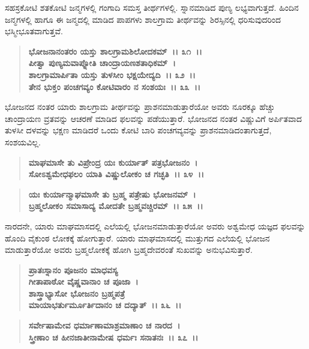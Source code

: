ಸಹಸ್ರಕೋಟಿ ಶತಕೋಟಿ ಜನ್ಮಗಳಲ್ಲಿ ಗಂಗಾದಿ ಸಮಸ್ತ ತೀರ್ಥಗಳಲ್ಲಿ. ಸ್ನಾನಮಾಡಿದ ಪುಣ್ಯ ಲಭ್ಯವಾಗುತ್ತದೆ. ಹಿಂದಿನ ಜನ್ಮಗಳಲ್ಲಿ ಹಾಗೂ ಈ ಜನ್ಮದಲ್ಲಿ ಮಾಡಿದ ಪಾಪಗಳು ಶಾಲಗ್ರಾಮ ತೀರ್ಥವನ್ನು ಶಿರಸ್ಸಿನಲ್ಲಿ ಧರಿಸುವುದರಿಂದ ಭಸ್ಮೀಭೂತವಾಗುತ್ತವೆ.

\begin{verse}
\textbf{ಭೋಜನಾನಂತರಂ ಯಸ್ತು ಶಾಲಗ್ರಾಮಶಿಲೋದಕಮ್~।। ೩೧~।।}\\\textbf{ಪೀತ್ವಾ ಪುಣ್ಯಮವಾಪ್ನೋತಿ ಚಾಂದ್ರಾಯಣಶತಾಧಿಕಮ್~। }\\\textbf{ಶಾಲಗ್ರಾಮಾರ್ಪಿತಾ ಯಸ್ತು ತುಳಸೀಂ ಭಕ್ಷಯೇದ್ಯದಿ~।। ೩೨~।।} \\\textbf{ತೇನ ಭುಕ್ತಂ ಪಂಚಗವ್ಯಂ ಕೋಟಿವಾರಂ ನ ಸಂಶಯಃ~।। ೩೩~।।}
\end{verse}

ಭೋಜನದ ನಂತರ ಯಾರು ಶಾಲಗ್ರಾಮ ತೀರ್ಥವನ್ನು ಪ್ರಾಶನಮಾಡುತ್ತಾರೆಯೋ ಅವರು ನೂರಕ್ಕೂ ಹೆಚ್ಚು ಚಾಂದ್ರಾಯಣ ವ್ರತವನ್ನು ಆಚರಣೆ ಮಾಡಿದ ಫಲವನ್ನು ಪಡೆಯುತ್ತಾರೆ. ಭೋಜನದ ನಂತರ ವಿಷ್ಣುವಿಗೆ ಅರ್ಪಿತವಾದ ತುಳಸೀ ದಳವನ್ನು ಭಕ್ಷಣ ಮಾಡಿದರೆ ಒಂದು ಕೋಟಿ ಬಾರಿ ಪಂಚಗವ್ಯವನ್ನು ಪ್ರಾಶನಮಾಡಿದಂತಾಗುತ್ತದೆ, ಸಂಶಯವಿಲ್ಲ.

\begin{verse}
\textbf{ಮಾಘಮಾಸೇ ತು ವಿಪ್ರೇಂದ್ರ ಯಃ ಕುರ್ಯಾತ್ ಪತ್ರಭೋಜನಂ~।}\\\textbf{ಸೋಽಶ್ವಮೇಧಫಲಂ ಯಾತಿ ವಿಷ್ಣುಲೋಕಂ ಚ ಗಚ್ಛತಿ~।। ೩೪~।। }
\end{verse}

\begin{verse}
\textbf{ಯಃ ಕುರ್ಯಾನ್ಮಾಘಮಾಸೇ ತು ಬ್ರಹ್ಮ ಪತ್ರೇಷು ಭೋಜನಮ್~।}\\\textbf{ಬ್ರಹ್ಮಲೋಕಂ ಸಮಾಸಾದ್ಯ ಮೋದತೇ ಬ್ರಹ್ಮವಚ್ಚಿರಮ್~।। ೩೫~।।}
\end{verse}

ನಾರದನೇ, ಯಾರು ಮಾಘಮಾಸದಲ್ಲಿ ಎಲೆಯಲ್ಲಿ ಭೋಜನಮಾಡುತ್ತಾರೆಯೋ ಅವರು ಅಶ್ವಮೇಧ ಯಜ್ಞದ ಫಲವನ್ನು ಹೊಂದಿ ವೈಕುಂಠ ಲೋಕಕ್ಕೆ ಹೋಗುತ್ತಾರೆ. ಯಾರು ಮಾಘಮಾಸದಲ್ಲಿ ಮುತ್ತುಗದ ಎಲೆಯಲ್ಲಿ ಭೋಜನ ಮಾಡುತ್ತಾರೆಯೋ ಅವರು ಬ್ರಹ್ಮಲೋಕಕ್ಕೆ ಹೋಗಿ ಬ್ರಹ್ಮದೇವರಂತೆ ಸುಖವನ್ನು ಅನುಭವಿಸುತ್ತಾರೆ.

\begin{verse}
\textbf{ಪ್ರಾತಃಸ್ನಾನಂ ಪೂಜನಂ ಮಾಧವಸ್ಯ}\\\textbf{ಗೀತಾಪಾಠೋ ವೈಷ್ಣವಾನಾಂ ಚ ಪೂಜಾ~। }\\\textbf{ಶಾಸ್ತ್ರಾಭ್ಯಾಸೋ ಭೋಜನಂ ಬ್ರಹ್ಮಪತ್ರೆ} \\\textbf{ಮಾಯಾಭರ್ತುರ್ಮೂರ್ತಿದಾನಂ ಚ ದದ್ಯಾತ್~।। ೩೬~।। }
\end{verse}

\begin{verse}
\textbf{ಸರ್ವೇಷಾಮೇವ ಧರ್ಮಾಣಾಮಾಶ್ರಮಾಣಾಂ ಚ ನಾರದ~।}\\\textbf{ಸ್ತ್ರೀಣಾಂ ಚ ಹೀನಜಾತೀನಾಮೇಷ ಧರ್ಮಃ ಸನಾತನಃ~।। ೩೭~।।}
\end{verse}

